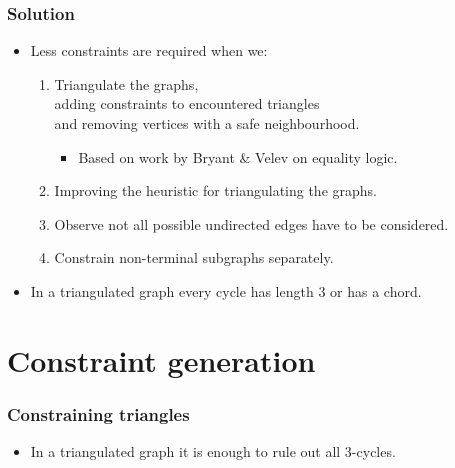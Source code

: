 \documentclass{beamer}
\begin{document}
\begin{frame}
    \frametitle{Solution}
    \begin{itemize}
        \item Less constraints are required when we:
        \begin{enumerate}
            \item Triangulate the graphs,\\
                    adding constraints to encountered triangles\\
                    and removing vertices with a safe neighbourhood.
            \begin{itemize}
                \item Based on work by Bryant \& Velev on equality logic.
            \end{itemize}
            \item Improving the heuristic for triangulating the graphs.
            \item Observe not all possible undirected edges have to be considered.
            \item Constrain non-terminal subgraphs separately.
        \end{enumerate}
        \item In a triangulated graph every cycle has length 3 or has a chord.
    \end{itemize}
\end{frame}

\section{Constraint generation}
\begin{frame}
    \frametitle{Constraining triangles}
    \begin{itemize}
        \item In a triangulated graph it is enough to rule out all 3-cycles.
    \end{itemize}
    \begin{figure}
    \end{figure}
\end{frame}
\end{document}
